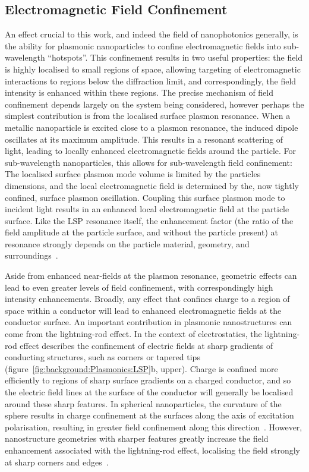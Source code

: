 \subsection{Electromagnetic Field Confinement}\label{sec:Plasmonics:confinement}

An effect crucial to this work, and indeed the field of nanophotonics generally, is the ability for plasmonic nanoparticles to confine electromagnetic fields into sub-wavelength ``hotspots''. This confinement results in two useful properties: the field is highly localised to small regions of space, allowing targeting of electromagnetic interactions to regions below the diffraction limit, and correspondingly, the field intensity is enhanced within these regions. The precise mechanism of field confinement depends largely on the system being considered, however perhaps the simplest contribution is from the localised surface plasmon resonance. 
When a metallic nanoparticle is excited close to a plasmon resonance, the induced dipole oscillates at its maximum amplitude. This results in a resonant scattering of light, leading to locally enhanced electromagnetic fields around the particle. For sub-wavelength nanoparticles, this allows for sub-wavelength field confinement: The localised surface plasmon mode volume is limited by the particles dimensions, and the local electromagnetic field is determined by the, now tightly confined, surface plasmon oscillation. Coupling this surface plasmon mode to incident light results in an enhanced local electromagnetic field at the particle surface. Like the LSP resonance itself, the enhancement factor (the ratio of the field amplitude at the particle surface, and without the particle present) at resonance strongly depends on the particle material, geometry, and surroundings~\cite{Dynich2009, Tanabe2008}.

Aside from enhanced near-fields at the plasmon resonance, geometric effects can lead to even greater levels of field confinement, with correspondingly high intensity enhancements. Broadly, any effect that confines charge to a region of space within a conductor will lead to enhanced electromagnetic fields at the conductor surface. 
An important contribution in plasmonic nanostructures can come from the lightning-rod effect. In the context of electrostatics, the lightning-rod effect describes the confinement of electric fields at sharp gradients of conducting structures, such as corners or tapered tips (figure~\ref{fig:background:Plasmonics:LSP}b, upper). Charge is confined more efficiently to regions of sharp surface gradients on a charged conductor, and so the electric field lines at the surface of the conductor will generally be localised around these sharp features. In spherical nanoparticles, the curvature of the sphere results in charge confinement at the surfaces along the axis of excitation polarisation, resulting in greater field confinement along this direction~\cite{Tanabe2008}. However, nanostructure geometries with sharper features greatly increase the field enhancement associated with the lightning-rod effect, localising the field strongly at sharp corners and edges~\cite{Dreaden2011, Lee2010, Valev2012d}.

